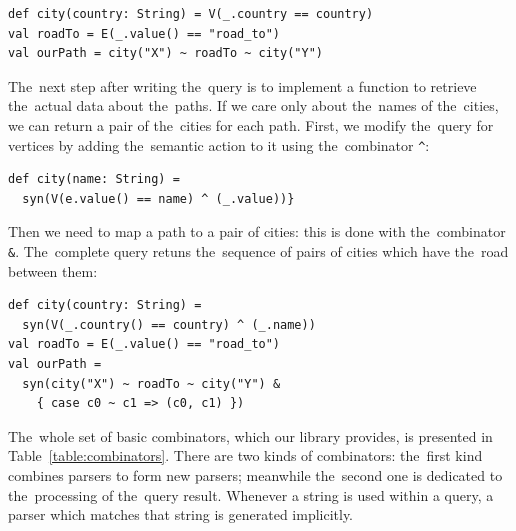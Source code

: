 \begin{lstlisting}
def city(country: String) = V(_.country == country)
val roadTo = E(_.value() == "road_to")
val ourPath = city("X") ~ roadTo ~ city("Y")
\end{lstlisting}

The~next step after writing the~query is to implement a function to retrieve the~actual data about the~paths.
If we care only about the~names of the~cities, we can return a pair of the~cities for each path.
First, we modify the~query for vertices by adding the~semantic action to it using the~combinator \lstinline{^}:

\begin{lstlisting}
def city(name: String) =
  syn(V(e.value() == name) ^ (_.value))}
\end{lstlisting}

Then we need to map a path to a pair of cities: this is done with the~combinator \lstinline{&}.
The~complete query retuns the~sequence of pairs of cities which have the~road between them:

\begin{lstlisting}
def city(country: String) =
  syn(V(_.country() == country) ^ (_.name))
val roadTo = E(_.value() == "road_to")
val ourPath =
  syn(city("X") ~ roadTo ~ city("Y") &
    { case c0 ~ c1 => (c0, c1) })
\end{lstlisting}

The~whole set of basic combinators, which our library provides, is presented in Table~\ref{table:combinators}.
There are two kinds of combinators: the~first kind combines parsers to form new parsers; meanwhile the~second one is dedicated to the~processing of the~query result.
Whenever a string is used within a query, a parser which matches that string is generated implicitly.

